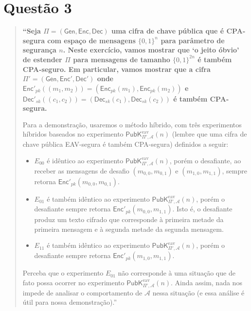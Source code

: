 \documentclass[11pt,a4paper]{article}
\newcommand{\Enc}{\mathsf{Enc}}
\newcommand{\Dec}{\mathsf{Dec}}
\newcommand{\Gen}{\mathsf{Gen}}
\newcommand{\PubKeav}[3]{\mathsf{PubK}^{\mathrm{eav}}_{#1,#2}(#3)}
\begin{document}
    \clearpage

    \section*{Questão 3}

    \begin{quote}\small\bfseries
        ``Seja $\Pi = (\Gen, \Enc, \Dec)$ uma cifra de chave pública que é CPA-segura com
        espaço de mensagens $\{0,1\}^n$ para parâmetro de segurança $n$. Neste exercício,
        vamos mostrar que `o jeito óbvio' de estender $\Pi$ para mensagens de tamanho
        $\{0,1\}^{2n}$ é também CPA-seguro. Em particular, vamos mostrar que a cifra
        $\Pi' = (\Gen, \Enc', \Dec')$ onde
        $\Enc'_{pk}((m_1, m_2)) = (\Enc_{pk}(m_1), \Enc_{pk}(m_2))$ e
        $\Dec'_{sk}((c_1, c_2)) = (\Dec_{sk}(c_1), \Dec_{sk}(c_2))$ é também CPA-segura.

        Para a demonstração, usaremos o método híbrido, com três experimentos híbridos
        baseados no experimento $\PubKeav{\Pi'}{\mathcal{A}}{n}$ (lembre que uma cifra de
        chave pública EAV-segura é também CPA-segura) definidos a seguir:

        \begin{itemize}
            \item $E_{00}$ é idêntico ao experimento $\PubKeav{\Pi'}{\mathcal{A}}{n}$, porém
            o desafiante, ao receber as mensagens de desafio $(m_{0,0}, m_{0,1})$ e
            $(m_{1,0}, m_{1,1})$, sempre retorna $\Enc'_{pk}(m_{0,0}, m_{0,1})$.
            \item $E_{01}$ é também idêntico ao experimento $\PubKeav{\Pi'}{\mathcal{A}}{n}$,
            porém o desafiante sempre retorna $\Enc'_{pk}(m_{0,0}, m_{1,1})$. Isto é, o
            desafiante produz um texto cifrado que corresponde à primeira metade da
            primeira mensagem e à segunda metade da segunda mensagem.
            \item $E_{11}$ é também idêntico ao experimento $\PubKeav{\Pi'}{\mathcal{A}}{n}$,
            porém o desafiante sempre retorna $\Enc'_{pk}(m_{1,0}, m_{1,1})$.
        \end{itemize}

        Perceba que o experimento $E_{01}$ não corresponde à uma situação que de fato
        possa ocorrer no experimento $\PubKeav{\Pi'}{\mathcal{A}}{n}$. Ainda assim, nada nos
        impede de analisar o comportamento de $\mathcal{A}$ nessa situação (e essa análise
        é útil para nossa demonstração).''
    \end{quote}
\end{document}
